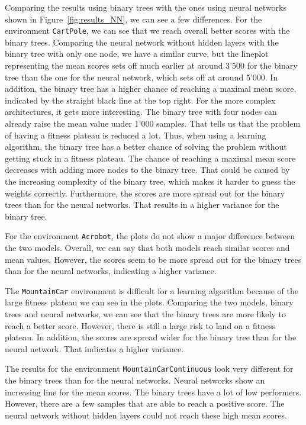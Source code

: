 Comparing the results using binary trees with the ones using neural networks shown in Figure~\ref{fig:results_NN}, we can see a few differences. For the environment \verb|CartPole|, we can see that we reach overall better scores with the binary trees. Comparing the neural network without hidden layers with the binary tree with only one node, we have a similar curve, but the lineplot representing the mean scores sets off much earlier at around 3'500 for the binary tree than the one for the neural network, which sets off at around 5'000. In addition, the binary tree has a higher chance of reaching a maximal mean score, indicated by the straight black line at the top right. For the more complex architectures, it gets more interesting. The binary tree with four nodes can already raise the mean value under 1'000 samples. That tells us that the problem of having a fitness plateau is reduced a lot. Thus, when using a learning algorithm, the binary tree has a better chance of solving the problem without getting stuck in a fitness plateau. The chance of reaching a maximal mean score decreases with adding more nodes to the binary tree. That could be caused by the increasing complexity of the binary tree, which makes it harder to guess the weights correctly. Furthermore, the scores are more spread out for the binary trees than for the neural networks. That results in a higher variance for the binary tree.

For the environment \verb|Acrobot|, the plots do not show a major difference between the two models. Overall, we can say that both models reach similar scores and mean values. However, the scores seem to be more spread out for the binary trees than for the neural networks, indicating a higher variance.

The \verb|MountainCar| environment is difficult for a learning algorithm because of the large fitness plateau we can see in the plots. Comparing the two models, binary trees and neural networks, we can see that the binary trees are more likely to reach a better score. However, there is still a large risk to land on a fitness plateau. In addition, the scores are spread wider for the binary tree than for the neural network. That indicates a higher variance.

The results for the environment \verb|MountainCarContinuous| look very different for the binary trees than for the neural networks. Neural networks show an increasing line for the mean scores. The binary trees have a lot of low performers. However, there are a few samples that are able to reach a positive score. The neural network without hidden layers could not reach these high mean scores.

